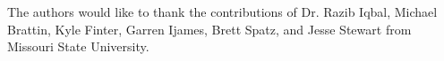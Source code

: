 \begin{acks}

The authors would like to thank the contributions of Dr. Razib Iqbal, Michael Brattin, Kyle Finter, Garren Ijames, Brett Spatz, and Jesse Stewart from Missouri State University.

\end{acks}

